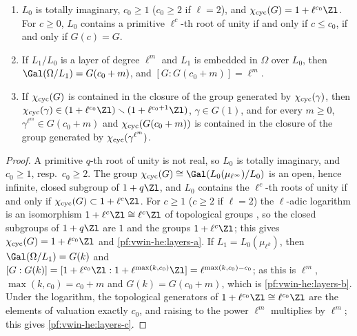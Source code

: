 \begin{lemma}\label{pf:vwin-he:layers}
\begin{enumerate}[label=(\alph*)]
\item\label{pf:vwin-he:layers-a} $L_0$ is totally imaginary, $c_0\ge1$ ($c_0\ge2$ if $\ell=2$), and
$\vwinhecyc(G)=1+\ell^{c_0}\Zl$. For $c\ge0$, $L_0$ contains a primitive $\ell^c$-th root of unity if and only if
$c\le c_0$, if and only if $G(c)=G$.
\item\label{pf:vwin-he:layers-b} If $L_1/L_0$ is a layer of degree $\ell^m$ and $L_1$ is embedded in $\Omega$ over
$L_0$, then $\Gal(\Omega/L_1)=G(c_0+m)$, and $[G:G(c_0+m)]=\ell^m$.
\item\label{pf:vwin-he:layers-c} If $\chi_{\mathrm{cyc}}(G)$ is contained in the closure of the group generated by
$\chi_{\mathrm{cyc}}(\gamma)$, then $\vwinhecyc(\gamma)\in(1+\ell^{c_0}\Zl)\smallsetminus(1+\ell^{c_0+1}\Zl)$, $\gamma\in G(1)$, and
for every $m\ge0$, $\gamma^{\ell^m}\in G(c_0+m)$ and $\chi_{\mathrm{cyc}}(G(c_0+m))$ is contained in the closure of the group
generated by $\chi_{\mathrm{cyc}}(\gamma^{\ell^m})$.
\end{enumerate}
\end{lemma}

\begin{proof}
A primitive $q$-th root of unity is not real, so $L_0$ is totally imaginary, and $c_0\ge1$, resp.\ $c_0\ge2$. The
group $\vwinhecyc(G)\cong\Gal(L_0(\mu_{\ell^\infty})/L_0)$ is an open, hence infinite, closed subgroup of
$1+q\Zl$, and $L_0$ contains the $\ell^c$-th roots of unity if and only if $\vwinhecyc(G)\subset1+\ell^c\Zl$. For
$c\ge1$ ($c\ge2$ if $\ell=2$) the $\ell$-adic logarithm is an isomorphism $1+\ell^c\Zl\cong\ell^c\Zl$ of topological
groups \cite[Ch.~II, \S5]{Neukirch1999}, so the closed subgroups of $1+q\Zl$ are $1$ and the groups $1+\ell^c\Zl$;
this gives $\vwinhecyc(G)=1+\ell^{c_0}\Zl$ and \ref{pf:vwin-he:layers-a}. If $L_1=L_0(\mu_{\ell^k})$, then
$\Gal(\Omega/L_1)=G(k)$ and $[G:G(k)]=[1+\ell^{c_0}\Zl:1+\ell^{\max(k,c_0)}\Zl]=\ell^{\max(k,c_0)-c_0}$; as this is
$\ell^m$, $\max(k,c_0)=c_0+m$ and $G(k)=G(c_0+m)$, which is \ref{pf:vwin-he:layers-b}. Under the logarithm, the
topological generators of $1+\ell^{c_0}\Zl\cong\ell^{c_0}\Zl$ are the elements of valuation exactly $c_0$, and
raising to the power $\ell^m$ multiplies by $\ell^m$; this gives \ref{pf:vwin-he:layers-c}.
\end{proof}

